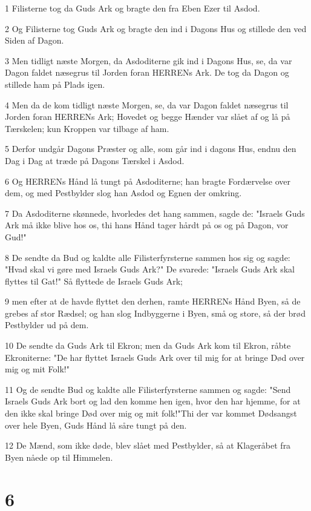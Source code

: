 \par 1 Filisterne tog da Guds Ark og bragte den fra Eben Ezer til Asdod.
\par 2 Og Filisterne tog Guds Ark og bragte den ind i Dagons Hus og stillede den ved Siden af Dagon.
\par 3 Men tidligt næste Morgen, da Asdoditerne gik ind i Dagons Hus, se, da var Dagon faldet næsegrus til Jorden foran HERRENs Ark. De tog da Dagon og stillede ham på Plads igen.
\par 4 Men da de kom tidligt næste Morgen, se, da var Dagon faldet næsegrus til Jorden foran HERRENs Ark; Hovedet og begge Hænder var slået af og lå på Tærskelen; kun Kroppen var tilbage af ham.
\par 5 Derfor undgår Dagons Præster og alle, som går ind i dagons Hus, endnu den Dag i Dag at træde på Dagons Tærskel i Asdod.
\par 6 Og HERRENs Hånd lå tungt på Asdoditerne; han bragte Fordærvelse over dem, og med Pestbylder slog han Asdod og Egnen der omkring.
\par 7 Da Asdoditerne skønnede, hvorledes det hang sammen, sagde de: "Israels Guds Ark må ikke blive hos os, thi hans Hånd tager hårdt på os og på Dagon, vor Gud!"
\par 8 De sendte da Bud og kaldte alle Filisterfyrsterne sammen hos sig og sagde: "Hvad skal vi gøre med Israels Guds Ark?" De svarede: "Israels Guds Ark skal flyttes til Gat!" Så flyttede de Israels Guds Ark;
\par 9 men efter at de havde flyttet den derhen, ramte HERRENs Hånd Byen, så de grebes af stor Rædsel; og han slog Indbyggerne i Byen, små og store, så der brød Pestbylder ud på dem.
\par 10 De sendte da Guds Ark til Ekron; men da Guds Ark kom til Ekron, råbte Ekroniterne: "De har flyttet Israels Guds Ark over til mig for at bringe Død over mig og mit Folk!"
\par 11 Og de sendte Bud og kaldte alle Filisterfyrsterne sammen og sagde: "Send Israels Guds Ark bort og lad den komme hen igen, hvor den har hjemme, for at den ikke skal bringe Død over mig og mit folk!"Thi der var kommet Dødsangst over hele Byen, Guds Hånd lå såre tungt på den.
\par 12 De Mænd, som ikke døde, blev slået med Pestbylder, så at Klageråbet fra Byen nåede op til Himmelen.

\chapter{6}

